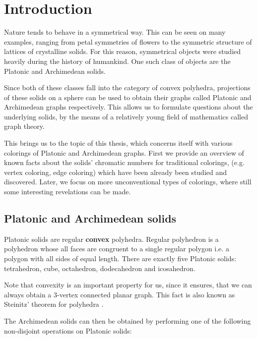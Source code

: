 \chapter*{Introduction}

Nature tends to behave in a symmetrical way. This can be seen on many examples, ranging from petal symmetries of flowers to the symmetric structure of lattices of crystalline solids. For this reason, symmetrical objects were studied heavily during the history of humankind. One such class of objects are the Platonic and Archimedean solids.

Since both of these classes fall into the category of convex polyhedra, projections of these solids on a sphere can be used to obtain their graphs called Platonic and Archimedean graphs respectively. This allows us to formulate questions about the underlying solids, by the means of a relatively young field of mathematics called graph theory.

This brings us to the topic of this thesis, which concerns itself with various colorings of Platonic and Archimedean graphs. First we provide an overview of known facts about the solids' chromatic numbers for traditional colorings, (e.g. vertex coloring, edge coloring) which have been already been studied and discovered. Later, we focus on more unconventional types of colorings, where still some interesting revelations can be made.

\section*{Platonic and Archimedean solids}

Platonic solids are regular \textbf{convex} polyhedra. Regular polyhedron is a polyhedron whose all faces are congruent to a single regular polygon i.e. a polygon with all sides of equal length. There are exactly five Platonic solids: tetrahedron, cube, octahedron, dodecahedron and icosahedron.

Note that convexity is an important property for us, since it ensures, that we can always obtain a 3-vertex connected planar graph. This fact is also known as Steinitz’ theorem for polyhedra \cite{kendall24}.

The Archimedean solids can then be obtained by performing one of the following non-disjoint operations on Platonic solids:


